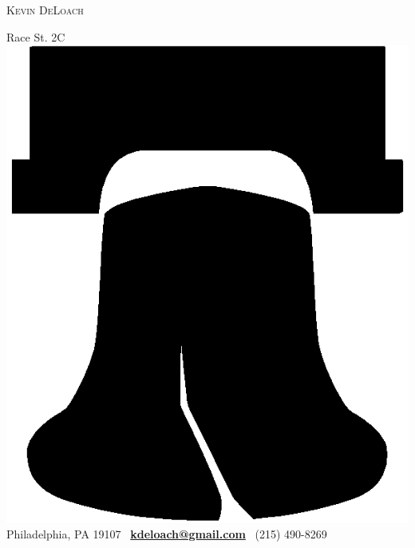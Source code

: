 \documentclass[12pt,a4paper]{article}
\begin{document}
\noindent
{\huge \textsc{Kevin DeLoach}}

 Race St. 2C
\includegraphics[scale=0.035]{Liberty-Bell-301x251}
Philadelphia, PA 19107
\hfill
\Letter 
\ \href{mailto:kdeloach@gmail.com}{\bfseries kdeloach@gmail.com}
\Telefon 
\ (215) 490-8269
\end{document}
